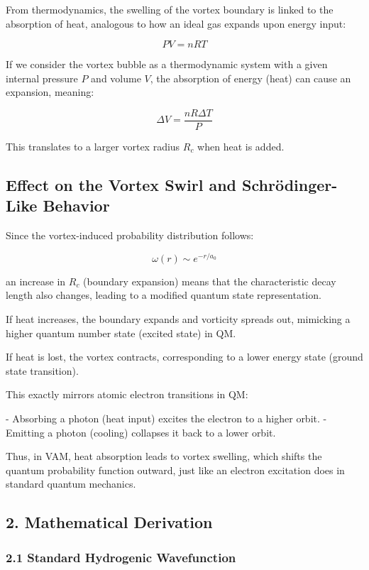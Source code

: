 From thermodynamics, the swelling of the vortex boundary is linked to the absorption of heat, analogous to how an ideal gas expands upon energy input:

\[ PV = nRT \]

If we consider the vortex bubble as a thermodynamic system with a given internal pressure \( P \) and volume \( V \), the absorption of energy (heat) can cause an expansion, meaning:

\[ \Delta V = \frac{nR\Delta T}{P} \]

This translates to a larger vortex radius \( R_c \) when heat is added.

\subsection*{Effect on the Vortex Swirl and Schrödinger-Like Behavior}

Since the vortex-induced probability distribution follows:

\[ \omega(r) \sim e^{-r/a_0} \]

an increase in \( R_c \) (boundary expansion) means that the characteristic decay length also changes, leading to a modified quantum state representation.

If heat increases, the boundary expands and vorticity spreads out, mimicking a higher quantum number state (excited state) in QM.

If heat is lost, the vortex contracts, corresponding to a lower energy state (ground state transition).

This exactly mirrors atomic electron transitions in QM:

- Absorbing a photon (heat input) excites the electron to a higher orbit.
- Emitting a photon (cooling) collapses it back to a lower orbit.

Thus, in VAM, heat absorption leads to vortex swelling, which shifts the quantum probability function outward, just like an electron excitation does in standard quantum mechanics.

\subsection*{2. Mathematical Derivation}

\subsubsection*{2.1 Standard Hydrogenic Wavefunction}

